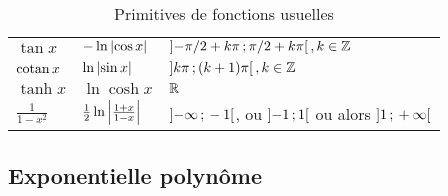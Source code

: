 \begin{table}[!h]
\begin{tabular}{|l|l|l|}
    \(\tan x\) & \(-\ln\left\lvert\cos x\right\rvert\) &
    \(\left] -\pi/2+k\pi \, ; {} \pi/2+k\pi \right[, k \in \mathbb{Z}\) \\
    \(\operatorname{cotan} x\)& \(\ln\left\lvert\sin x\right\rvert\) & \(\left] k\pi \, ; {} (k+1)\pi \right[, k \in
    \mathbb{Z}\) \\
    \(\tanh x\)& \(\ln\cosh x\) & \(\mathbb{R}\)\\
    \(\frac{1}{1-x^2}\) & \(\frac{1}{2} \ln\left\lvert\frac{1+x}{1-x}\right\rvert\) &
    \(\left] -\infty \, ; {} -1 \right[\), ou \(\left] -1 \, ; {} 1 \right[\) ou alors
    \(\left] 1 \, ; {} +\infty \right[\)\\
  \hline\end{tabular}
  \caption{Primitives de fonctions usuelles}
  \label{tab:primitivesusuelles}
\end{table}

\subsection{Exponentielle polynôme}

